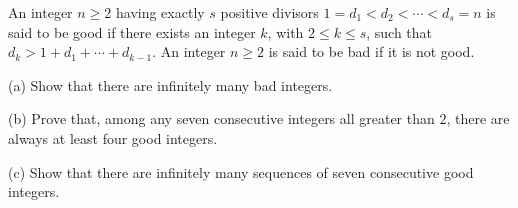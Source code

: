 An integer $n\geq 2$ having exactly $s$ positive divisors $1=d_1<d_2<\cdots<d_s=n$ is said to be good if there exists an integer $k$,  with $2\leq k\leq s$,  such that $d_k>1+d_1+\cdots+d_{k-1}$. An integer $n\geq 2$ is said to be bad if it is not good.

(a) Show that there are infinitely many bad integers.

(b) Prove that, among any seven consecutive integers all greater than $2$,  there are always at least four good integers.

(c) Show that there are infinitely many sequences of seven consecutive good integers.